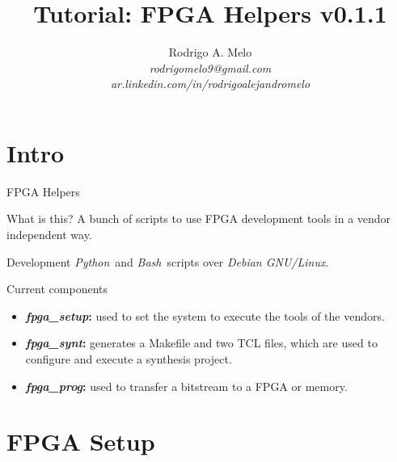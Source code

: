 \documentclass{beamer}
\title[FPGA Helpers]{Tutorial: FPGA Helpers v0.1.1}
\author{
  Rodrigo A. Melo\\
  \textit{rodrigomelo9@gmail.com}\\
  \textit{ar.linkedin.com/in/rodrigoalejandromelo}
}
\newcommand{\python}         {\textit{Python}}
\newcommand{\bash}           {\textit{Bash}}
\newcommand{\debian}         {\textit{Debian GNU/Linux}}
\newcommand{\fpgasetup}      {\textit{fpga\_setup}}
\newcommand{\fpgasynt}       {\textit{fpga\_synt}}
\newcommand{\fpgaprog}       {\textit{fpga\_prog}}
\begin{document}
\begin{frame}
  \titlepage
\end{frame}

\section{Intro}

\begin{frame}{FPGA Helpers}
  \begin{exampleblock}{What is this?}
    A bunch of scripts to use FPGA development tools in a vendor independent way.
  \end{exampleblock}
  \begin{block}{Development}
    \python\ and \bash\ scripts over \debian.
  \end{block}
\end{frame}

\begin{frame}{Current components}
  \begin{itemize}
    \item \textbf{\fpgasetup:} used to set the system to execute the tools of the vendors.
    \item \textbf{\fpgasynt:} generates a Makefile and two TCL files, which are used to
      configure and execute a synthesis project.
    \item \textbf{\fpgaprog:} used to transfer a bitstream to a FPGA or memory.
  \end{itemize}
\end{frame}


\section{FPGA Setup}
\end{document}
